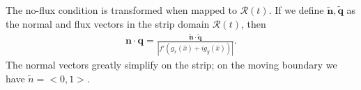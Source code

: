 The no-flux condition is transformed when mapped to $\mathcal{R}(t)$. If we define $\bm{\tilde{n}},\bm{\tilde{q}}$ as the normal and flux vectors in the strip domain $\mathcal{R}(t)$, then
\begin{align}
\bm{n} \cdot \bm{q} = \frac{\bm{\tilde{n}} \cdot \bm{\tilde{q}}}{|f'(g_x(\hat{x})+i g_y(\hat{x}))|}.
\end{align}
The normal vectors greatly simplify on the strip; on the moving boundary we have $\tilde{n}=<0,1>$.




